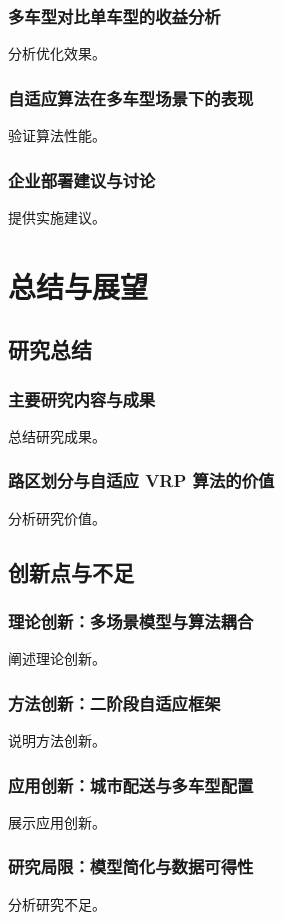 \documentclass[12pt,a4paper,twoside]{ctexbook}
\begin{document}
\subsection{多车型对比单车型的收益分析}
分析优化效果。

\subsection{自适应算法在多车型场景下的表现}
验证算法性能。

\subsection{企业部署建议与讨论}
提供实施建议。

\chapter{总结与展望}
\section{研究总结}
\subsection{主要研究内容与成果}
总结研究成果。

\subsection{路区划分与自适应 VRP 算法的价值}
分析研究价值。

\section{创新点与不足}
\subsection{理论创新：多场景模型与算法耦合}
阐述理论创新。

\subsection{方法创新：二阶段自适应框架}
说明方法创新。

\subsection{应用创新：城市配送与多车型配置}
展示应用创新。

\subsection{研究局限：模型简化与数据可得性}
分析研究不足。
\end{document}
